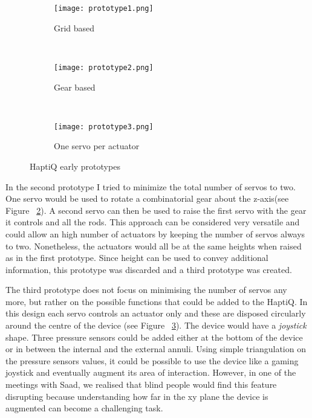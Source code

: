 \begin{figure}
        \centering
        \begin{subfigure}[H]{0.5\textwidth}
                \texttt{[image: prototype1.png]}
                \caption{Grid based}
                \label{fig:first prototype}
        \end{subfigure}%
        ~ %
        \begin{subfigure}[H]{0.5\textwidth}
                \texttt{[image: prototype2.png]}
                \caption{Gear based}
                \label{fig:second prototype}
        \end{subfigure}
        ~ %
        \begin{subfigure}[H]{0.5\textwidth}
                \texttt{[image: prototype3.png]}
                \caption{One servo per actuator}
                \label{fig:third prototype}
        \end{subfigure}
        \caption{HaptiQ early prototypes}\label{fig:HaptiQ-early-prototypes}
\end{figure}

In the second prototype I tried to minimize the total number of servos to two. One servo would be used to rotate a combinatorial gear about the z-axis(see Figure ~\ref{fig:second prototype}). A second servo can then be used to raise the first servo with the gear it controls and all the rods. This approach can be considered very versatile and could allow an high number of actuators by keeping the number of servos always to two. Nonetheless, the actuators would all be at the same heights when raised as in the first prototype. Since height can be used to convey additional information, this prototype was discarded and a third prototype was created.

The third prototype does not focus on minimising the number of servos any more, but rather on the possible functions that could be added to the HaptiQ. In this design each servo controls an actuator only and these are disposed circularly around the centre of the device (see Figure ~\ref{fig:third prototype}). The device would have a \textit{joystick} shape. Three pressure sensors could be added either at the bottom of the device or in between the internal and the external annuli. Using simple triangulation on the pressure sensors values, it could be possible to use the device like a gaming joystick and eventually augment its area of interaction. However, in one of the meetings with Saad, we realised that blind people would find this feature disrupting because understanding how far in the xy plane the device is augmented can become a challenging task. 

